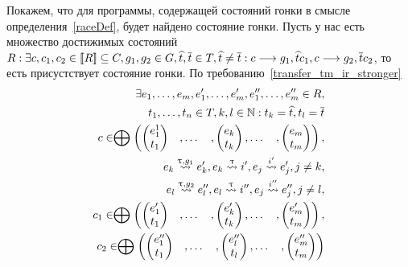 Покажем, что для программы, содержащей состояний гонки в смысле определения~\ref{raceDef}, будет найдено состояние гонки.
Пусть у нас есть множество достижимых состояний $R: \exists c, c_1, c_2 \in [\![ R ]\!] \subseteq C, g_1, g_2 \in G, \widehat{t}, \overline{t} \in T, \widehat{t} \neq \overline{t}: c \longrightarrow{g_1, \widehat{t}} c_1, c \longrightarrow{g_2, \overline{t}} c_2$, то есть присустствует состояние гонки.
По требованию~\ref{transfer_tm_ir_stronger} 
\begin{align}
\exists e_1,\dots,e_m,e_1', \dots, e_m', e_1'',\dots,e_m'' \in R, \nonumber \\
t_1, \dots, t_n \in T, k, l \in \mathbb{N}: t_k = \widehat{t}, t_l = \overline{t} \nonumber \\
c \in \mathrel{\bigoplus}
\begin{pmatrix}
\begin{pmatrix}
e_1^1 \\
t_1 
\end{pmatrix}& ,
\dots& ,
\begin{pmatrix}
e_k \\
t_k 
\end{pmatrix},
\dots& ,
\begin{pmatrix}
e_m \\
t_m 
\end{pmatrix}
\end{pmatrix}, \nonumber \\
e_k \stackrel{\uptau, g_1}{\leadsto} e_k', e_k \stackrel{\uptau}{\leadsto} i', e_j \stackrel{i'}{\leadsto} e_j', j \neq k, \nonumber \\
e_l \stackrel{\uptau, g_2}{\leadsto} e_l'', e_l \stackrel{\uptau}{\leadsto} i'', e_j \stackrel{i''}{\leadsto} e_j'', j \neq l, \nonumber \\
c_1 \in \mathrel{\bigoplus}
\begin{pmatrix}
\begin{pmatrix}
e_1' \\
t_1 
\end{pmatrix}& ,
\dots& ,
\begin{pmatrix}
e_k' \\
t_k 
\end{pmatrix},
\dots& ,
\begin{pmatrix}
e_m' \\
t_m 
\end{pmatrix}
\end{pmatrix},\nonumber \\
c_2 \in \mathrel{\bigoplus}
\begin{pmatrix}
\begin{pmatrix}
e_1'' \\
t_1 
\end{pmatrix}& ,
\dots& ,
\begin{pmatrix}
e_l'' \\
t_l 
\end{pmatrix},
\dots& ,
\begin{pmatrix}
e_m'' \\
t_m 
\end{pmatrix}
\end{pmatrix} \nonumber
\end{align}

